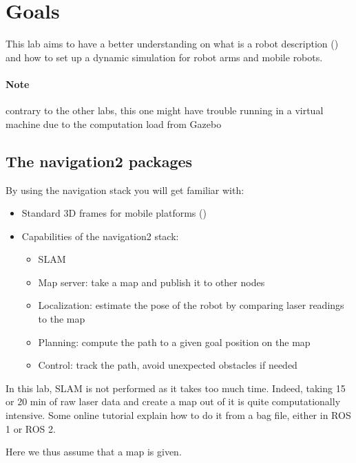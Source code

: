 \documentclass{ecnreport}
\author{O. Kermorgant}
\begin{document}


\section{Goals}

This lab aims to have a better understanding on what is a robot description () and how to set up a dynamic simulation for robot arms and mobile robots.

\paragraph{Note} contrary to the other labs, this one might have trouble running in a virtual machine due to the computation load from Gazebo
 
\subsection{The navigation2 packages}
 
By using the navigation stack you will get familiar with:
\begin{itemize}
 \item Standard 3D frames for mobile platforms ()
 \item Capabilities of the navigation2 stack:
 \begin{itemize}
  \item SLAM
  \item Map server: take a map and publish it to other nodes
  \item Localization: estimate the pose of the robot by comparing laser readings to the map
  \item Planning: compute the path to a given goal position on the map
  \item Control: track the path, avoid unexpected obstacles if needed
 \end{itemize}
\end{itemize}

In this lab, SLAM is not performed as it takes too much time. Indeed, taking 15 or 20 min of raw laser data and create a map out of it is quite computationally intensive. Some online tutorial explain how to do it from a bag file, either in ROS 1 or ROS 2.

Here we thus assume that a map is given.
\end{document}
